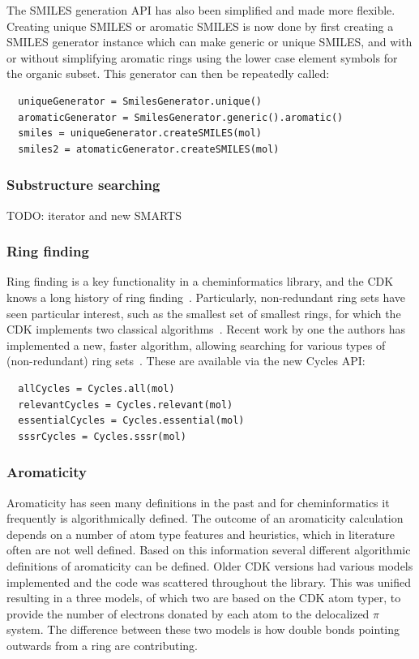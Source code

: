 \documentclass[10pt]{bmcart}
\begin{document}
  The SMILES generation API has also been simplified and made more flexible.
  Creating unique SMILES or aromatic SMILES is now done by first creating a
  SMILES generator instance which can make generic or unique SMILES, and with
  or without simplifying aromatic rings using the lower case element symbols
  for the organic subset. This generator can then be repeatedly called:

\begin{verbatim}
  uniqueGenerator = SmilesGenerator.unique()
  aromaticGenerator = SmilesGenerator.generic().aromatic()
  smiles = uniqueGenerator.createSMILES(mol)
  smiles2 = atomaticGenerator.createSMILES(mol)
\end{verbatim}

  \subsubsection*{Substructure searching}

  TODO: iterator and new SMARTS

  \subsubsection*{Ring finding}

  Ring finding is a key functionality in a cheminformatics library, and the CDK
  knows a long history of ring finding~\cite{May2014}. Particularly, non-redundant
  ring sets have seen particular interest, such as the smallest set of smallest
  rings, for which the CDK implements two classical algorithms~\cite{Figueras1996,Berger2004}.
  Recent work by one the authors has implemented a new, faster algorithm, allowing
  searching for various types of (non-redundant) ring sets~\cite{May2014}. These
  are available via the new Cycles API:

\begin{verbatim}
  allCycles = Cycles.all(mol)
  relevantCycles = Cycles.relevant(mol)
  essentialCycles = Cycles.essential(mol)
  sssrCycles = Cycles.sssr(mol)
\end{verbatim}

  \subsubsection*{Aromaticity}

  Aromaticity has seen many definitions in the past and for cheminformatics it
  frequently is algorithmically defined. The outcome of an aromaticity calculation
  depends on a number of atom type features and heuristics, which in literature
  often are not well defined. Based on this information several different
  algorithmic definitions of aromaticity can be defined. Older CDK versions had
  various models implemented and the code was scattered throughout the library.
  This was unified resulting in a three models, of which two are based on the
  CDK atom typer, to provide the number of electrons donated by each atom to
  the delocalized $\pi$ system. The difference between these two models is
  how double bonds pointing outwards from a ring are contributing.
\end{document}
